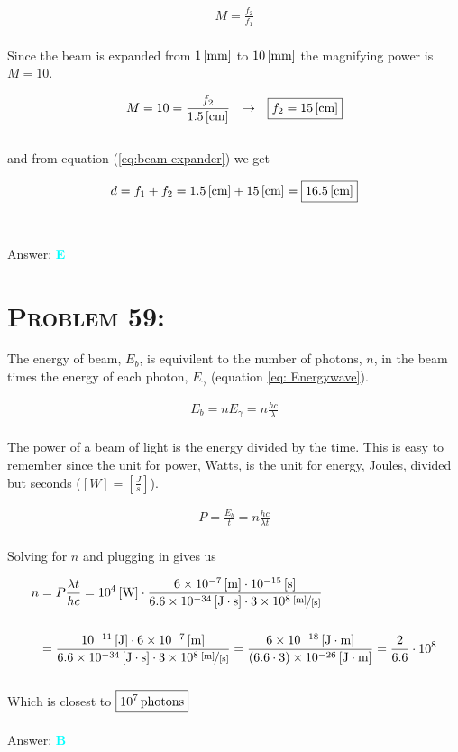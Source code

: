 \documentclass{article}
\providecommand{\e}[1]{\ensuremath{\times 10^{#1}}}
\begin{document}
\begin{gather}
M = \frac{f_{2}}{f_{1}}
\end{gather}
\\
Since the beam is expanded from $\unit[1]{[mm]}$ to $\unit[10]{[mm]}$ the magnifying power is $M = 10$.

\begin{gather}
M = 10 = \frac{f_{2}}{\unit[1.5]{[cm]}} \hspace{.1in} \rightarrow \hspace{.1in} \boxed{f_{2} = \unit[15]{[cm]}}\nonumber
\end{gather}
\\
and from equation (\ref {eq:beam expander}) we get 

\begin{gather}
d = f_{1} + f_{2} = \unit[1.5]{[cm]} + \unit[15]{[cm]} = \boxed{\unit[16.5]{[cm]}}
\end{gather}
\\\\
Answer: \textbf{\textcolor{cyan}E}\\


\section{\textsc{Problem 59:}} The energy of beam, $E_{b}$, is equivilent to the number of photons, $n$, in the beam times the energy of each photon, $E_{\gamma}$ (equation \ref{eq: Energywave}).

\begin{gather}
E_{b} = nE_{\gamma} = n \frac{hc}{\lambda}
\end{gather}
\\
The power of a beam of light is the energy divided by the time. This is easy to remember since the unit for power, Watts, is the unit for energy, Joules, divided but seconds ($[W] = \left[  \frac{J}{s} \right]$).

\begin{gather}
P = \frac{E_{b}}{t} = n \frac{hc}{\lambda t}\nonumber
\end{gather}
\\
Solving for $n$ and plugging in gives us

\begin{align}
%
n &= P \frac{\lambda t}{hc} 
%
= \unit[10^{4}]{[W]} \cdot  \frac{ \unit[6\e{-7}]{[m]} \cdot \unit[10^{-15}]{[s]} }{\unit[6.6\e{-34}]{[J \cdot s]} \cdot \unitfrac[3\e8]{[m]}{[s]}} \nonumber\\
%
\nonumber\\
%
&=  \frac{\unit[10^{-11}]{[J]} \cdot \unit[6\e{-7}]{[m]}}{\unit[6.6\e{-34}]{[J \cdot s]} \cdot \unitfrac[3\e8]{[m]}{[s]}} 
%
= \frac{\unit[6\e{-18}]{[J\cdot m]}}{\unit[(6.6\cdot 3)\e{-26}]{[J \cdot m]}} 
%
= \frac{2}{6.6} \cdot 10^{8} \nonumber
%
\end{align}
\\
Which is closest to $\boxed{\unit[10^{7}]{photons}}$
\\\\
Answer: \textbf{\textcolor{cyan}B}\\
\end{document}

